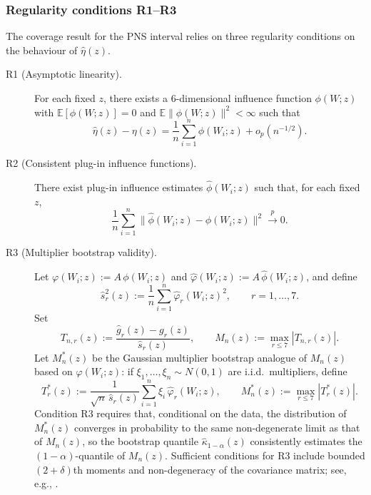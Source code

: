 \documentclass[accepted]{uai2026} %
\theoremstyle{plain}
\theoremstyle{definition}
\theoremstyle{remark}
\begin{document}
\subsubsection{Regularity conditions R1--R3}
\label{subsubsec:regularity-R}

The coverage result for the PNS interval relies on three regularity conditions
on the behaviour of $\hat\eta(z)$.

\begin{description}
  \item[R1 (Asymptotic linearity).]
  For each fixed $z$, there exists a $6$-dimensional influence function
  $\phi(W;z)$ with $\mathbb{E}[\phi(W;z)] = 0$ and
  $\mathbb{E}\|\phi(W;z)\|^2 < \infty$ such that
  \begin{equation}
    \label{eq:R1-main}
    \hat\eta(z) - \eta(z)
    = \frac{1}{n}\sum_{i=1}^n \phi(W_i;z) + o_p(n^{-1/2}) .
  \end{equation}

  \item[R2 (Consistent plug-in influence functions).]
  There exist plug-in influence estimates $\hat\phi(W_i;z)$ such that, for each
  fixed $z$,
  \begin{equation}
    \label{eq:R2-main}
    \frac{1}{n}\sum_{i=1}^n
      \bigl\|\hat\phi(W_i;z) - \phi(W_i;z)\bigr\|^2
    \xrightarrow{p} 0 .
  \end{equation}

  \item[R3 (Multiplier bootstrap validity).]
  Let $\varphi(W_i;z) := A\,\phi(W_i;z)$ and
  $\hat\varphi(W_i;z) := A\,\hat\phi(W_i;z)$, and define
  \[
    \hat s_r^2(z)
    := \frac{1}{n}\sum_{i=1}^n \hat\varphi_r(W_i;z)^2,
    \qquad r=1,\dots,7.
  \]
  Set
  \[
    T_{n,r}(z)
      := \frac{\hat g_r(z) - g_r(z)}{\hat s_r(z)},
    \qquad
    M_n(z) := \max_{r\le 7} |T_{n,r}(z)| .
  \]
  Let $M_n^*(z)$ be the Gaussian multiplier bootstrap analogue of $M_n(z)$
  based on $\hat\varphi(W_i;z)$: if $\xi_1,\dots,\xi_n \sim N(0,1)$ are
  i.i.d.\ multipliers, define
  \[
    T_r^*(z)
    := \frac{1}{\sqrt{n}\,\hat s_r(z)}
       \sum_{i=1}^n \xi_i\,\hat\varphi_r(W_i;z),
    \qquad
    M_n^*(z) := \max_{r\le 7} |T_r^*(z)|.
  \]
  Condition R3 requires that, conditional on the data, the distribution of $M_n^*(z)$
  converges in probability to the same non-degenerate limit as that of $M_n(z)$,
  so the bootstrap quantile $\hat \kappa_{1-\alpha}(z)$ consistently estimates the
  $(1-\alpha)$-quantile of $M_n(z)$.  Sufficient conditions for R3 include
  bounded $(2+\delta)$th moments and non-degeneracy of the covariance matrix;
  see, e.g., \citep{vandervaart1996weak,chernozhukov2013gaussian}.
\end{description}
\end{document}
